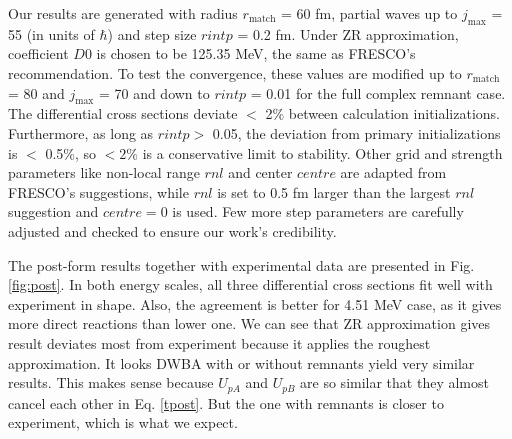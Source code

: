 Our results are generated with radius $r_{\mathrm{match}}$ = 60 fm, partial waves up to $j_{\max}$ = 55 (in units of $\hbar$) and step size $rintp$ = 0.2 fm. 
Under ZR approximation, coefficient $D0$ is chosen to be 125.35 MeV, the same as FRESCO's recommendation. 
To test the convergence, these values are modified up to $r_{\mathrm{match}}$ = 80 and $j_{\max}$ = 70 and down to $rintp$ = 0.01 for the full complex remnant case.
 The differential cross sections deviate $<$ 2$\%$  between calculation initializations. 
 Furthermore, as long as $rintp >$ 0.05, the deviation from primary initializations is $<$ 0.5$\%$, so $< 2\%$ is a conservative limit to stability. 
 Other grid and strength parameters like non-local range $rnl$ and center $centre$ are adapted from FRESCO's suggestions,
while $rnl$ is set to 0.5 fm larger than the largest $rnl$ suggestion and $centre=0$ is used.
Few more step parameters are carefully adjusted and checked to ensure our work's credibility.

The post-form results together with experimental data \cite{PhysRev.101.209} are presented in Fig. \ref{fig:post}.
In both energy scales, all three differential cross sections fit well with experiment in shape. 
Also, the agreement is better for 4.51 MeV case, as it gives more direct reactions than lower one.
We can see that ZR approximation gives result deviates most from experiment because it applies the roughest approximation.
It looks DWBA with or without remnants yield very similar results.
This makes sense because $U_{pA}$ and $U_{pB}$ are so similar that they almost cancel each other in Eq. \ref{tpost}.
But the one with remnants is closer to experiment, which is what we expect. 